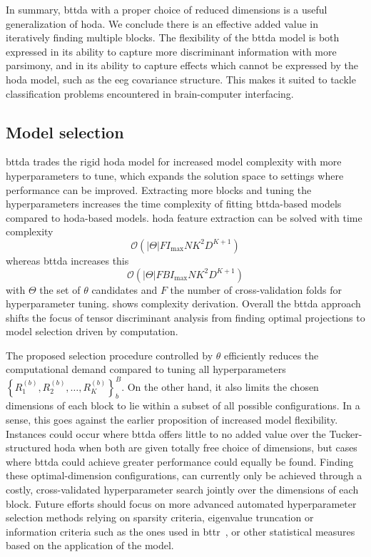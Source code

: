 \documentclass[twocolumn]{article}
\begin{document}
In summary, \ac{bttda} with a proper choice of reduced dimensions is a useful generalization
of \ac{hoda}.
We conclude there is an effective	added value in iteratively finding multiple blocks.
The flexibility of the \ac{bttda} model is both expressed in its ability
to capture more discriminant information with more parsimony,
and in its ability to capture effects which cannot be expressed by the \ac{hoda}
model, such as the \ac{eeg} covariance structure.
This makes it suited to tackle classification problems encountered in
brain-computer interfacing.

\subsection{Model selection}

\Ac{bttda} trades the rigid \ac{hoda} model for increased model complexity with more
hyperparameters to tune, which expands the solution space to settings where
performance can be improved.
Extracting more blocks and tuning the hyperparameters increases the time
complexity of fitting \ac{bttda}-based models compared to \ac{hoda}-based models.
\Ac{hoda} feature extraction can be solved with time complexity
\begin{equation}
	\mathcal{O}\left(\left|\Theta\right|FI_\text{max}NK^2D^{K+1}\right)
\end{equation}
whereas \ac{bttda} increases this
\begin{equation}
	\mathcal{O}\left(\left|\Theta\right|FBI_\text{max}NK^2D^{K+1}\right)
\end{equation}
with $\Theta$ the set of $\theta$ candidates and $F$ the number of
cross-validation folds for hyperparameter tuning.
 shows complexity derivation.
Overall the \ac{bttda} approach shifts the focus of tensor discriminant analysis
from finding optimal projections to model selection driven by computation.

The proposed selection procedure controlled by $\theta$ efficiently
reduces the computational demand compared to tuning all hyperparameters
$\textstyle{\left\{ R_1^{(b)},R_2^{(b)},\ldots,R_K^{(b)}\right\}_b^B}$.
On the other hand, it also limits the chosen dimensions of each block to lie
within a subset of all possible configurations.
In a sense, this goes against the earlier proposition of increased model
flexibility.
Instances could occur where \ac{bttda} offers little to no added value over the
Tucker-structured \ac{hoda} when both are given totally free choice of
dimensions, but cases where \ac{bttda} could achieve greater performance could
equally be found.
Finding these optimal-dimension configurations, can currently only be achieved
through a costly, cross-validated hyperparameter search jointly over the
dimensions of each block.
Future efforts should focus on more advanced automated hyperparameter selection
methods relying on sparsity criteria, eigenvalue truncation or information
criteria such as the ones used in \ac{bttr}~\cite{Faes2022}, or other
statistical measures based on the application of the model.
\end{document}
